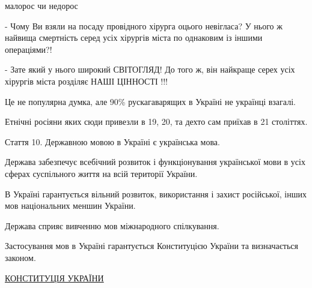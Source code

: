 \begin{itemize}
 
малорос чи недорос

 
- Чому Ви взяли на посаду провідного хірурга оцього невігласа? У нього ж
найвища смертність серед усіх хірургів міста по однаковим із іншими
операціями?!

- Зате який у нього широкий СВІТОГЛЯД! До того ж, він найкраще серех усіх хірургів міста розділяє НАШІ ЦІННОСТІ !!!

 

Це не популярна думка, але 90\% рускагаварящих в Україні не українці взагалі.

Етнічні росіяни яких сюди привезли в 19, 20, та дехто сам приїхав в 21
століттях.

 

Стаття 10. Державною мовою в Україні є українська мова.

Держава забезпечує всебічний розвиток і функціонування української мови в усіх
сферах суспільного життя на всій території України.

В Україні гарантується вільний розвиток, використання і захист російської,
інших мов національних меншин України.

Держава сприяє вивченню мов міжнародного спілкування.

Застосування мов в Україні гарантується Конституцією України та визначається
законом.

\href{https://zakon.rada.gov.ua/laws/show/254к/96-вр}{%
КОНСТИТУЦІЯ УКРАЇНИ%
}



\end{itemize}
